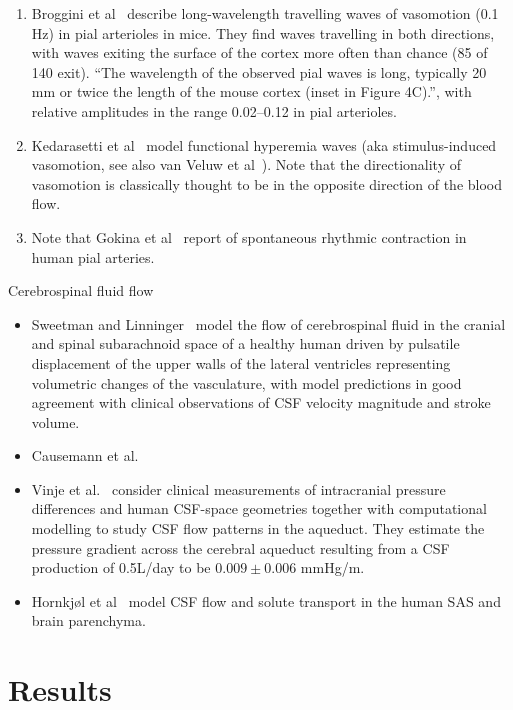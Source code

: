 \documentclass[fleqn,10pt]{wlscirep}
\begin{document}
\begin{enumerate}
\item
  Broggini et al~\cite{broggini2024long} describe long-wavelength travelling waves of vasomotion (0.1 Hz) in pial arterioles in mice. They find waves travelling in both directions, with waves exiting the surface of the cortex more often than chance (85 of 140 exit). ``The wavelength of the observed pial waves is long, typically 20 mm or twice the length of the mouse cortex (inset in Figure 4C).'', with relative amplitudes in the range 0.02--0.12 in pial arterioles.
\item
  Kedarasetti et al~\cite{kedarasetti2020functional} model functional hyperemia waves (aka stimulus-induced vasomotion, see also van Veluw et al~\cite{vanveluw2020vasomotion}). Note that the directionality of vasomotion is classically thought to be in the opposite direction of the blood flow.
\item
  Note that Gokina et al~\cite{gokina1996electrical} report of spontaneous rhythmic contraction in human pial arteries.
\end{enumerate}
Cerebrospinal fluid flow
\begin{itemize}
\item
  Sweetman and Linninger~\cite{sweetman2011cerebrospinal} model the flow of cerebrospinal fluid in the cranial and spinal subarachnoid space of a healthy human driven by pulsatile displacement of the upper walls of the lateral ventricles representing volumetric changes of the vasculature, with model predictions in good agreement with clinical observations of CSF velocity magnitude and stroke volume. 
\item Causemann et al.~\cite{causemann2022human}
\item
  Vinje et al.~\cite{vinje2019respiratory} consider clinical measurements of intracranial pressure differences and human CSF-space geometries together with computational modelling to study CSF flow patterns in the aqueduct. They estimate the pressure gradient across the cerebral aqueduct resulting from a CSF production of 0.5L/day to be $0.009 \pm 0.006$ mmHg/m.
\item Hornkjøl et al~\cite{hornkjol2022csf} model CSF flow and solute transport in the human SAS and brain parenchyma. 
\end{itemize}

\section*{Results}
\end{document}
